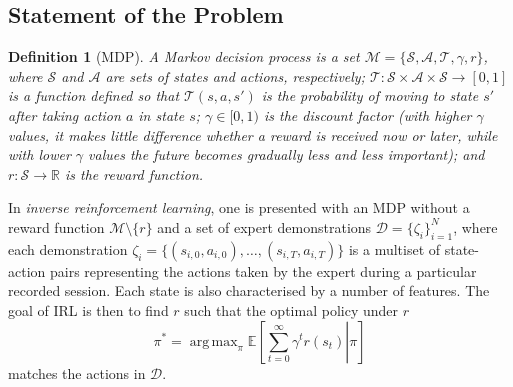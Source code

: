 \documentclass{mpaper}
\newtheorem{definition}[theorem]{Definition}
\DeclareMathOperator*{\argmax}{arg\,max}
\begin{document}
\subsection{Statement of the Problem}

\begin{definition}[MDP]
  A \emph{Markov decision process} is a set $\mathcal{M} = \{ \mathcal{S},
  \mathcal{A}, \mathcal{T}, \gamma, r \}$, where $\mathcal{S}$ and
  $\mathcal{A}$ are sets of states and actions, respectively; $\mathcal{T} :
  \mathcal{S} \times \mathcal{A} \times \mathcal{S} \to [0, 1]$ is a function
  defined so that $\mathcal{T}(s, a, s')$ is the probability of moving to state $s'$
  after taking action $a$ in state $s$; $\gamma \in [0, 1)$ is the discount
  factor (with higher $\gamma$ values, it makes little difference whether a
  reward is received now or later, while with lower $\gamma$ values the future
  becomes gradually less and less important); and $r : \mathcal{S} \to
  \mathbb{R}$ is the reward function.
\end{definition}

In \emph{inverse reinforcement learning}, one is presented with an MDP without a
reward function $\mathcal{M} \setminus \{ r \}$ and a set of expert
demonstrations $\mathcal{D} = \{ \zeta_i \}_{i=1}^N$, where each demonstration
$\zeta_i = \{ (s_{i,0}, a_{i,0}), \dots, (s_{i,T}, a_{i,T}) \}$ is a multiset of
state-action pairs representing the actions taken by the expert during a
particular recorded session. Each state is also characterised by a number of
features. The goal of IRL is then to find $r$ such that the optimal policy under
$r$
\[ \pi^* = \argmax_\pi \mathbb{E}\left[ \left. \sum_{t=0}^\infty \gamma^t r(s_t)
    \right| \pi \right] \]
matches the actions in $\mathcal{D}$.
\end{document}
